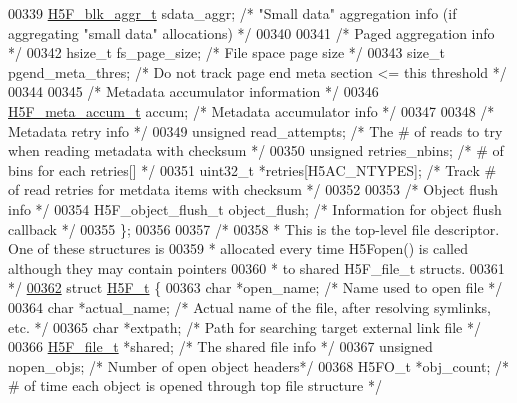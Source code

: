 \begin{DoxyCode}
00339     \hyperlink{struct_h5_f__blk__aggr__t}{H5F\_blk\_aggr\_t} sdata\_aggr;                  \textcolor{comment}{/* "Small data" aggregation info (if
       aggregating "small data" allocations) */}
00340 
00341     \textcolor{comment}{/* Paged aggregation info */}
00342     hsize\_t fs\_page\_size;                           \textcolor{comment}{/* File space page size */}
00343     \textcolor{keywordtype}{size\_t} pgend\_meta\_thres;                        \textcolor{comment}{/* Do not track page end meta section <= this threshold
       */}
00344 
00345     \textcolor{comment}{/* Metadata accumulator information */}
00346     \hyperlink{struct_h5_f__meta__accum__t}{H5F\_meta\_accum\_t} accum;     \textcolor{comment}{/* Metadata accumulator info            */}
00347 
00348     \textcolor{comment}{/* Metadata retry info */}
00349     \textcolor{keywordtype}{unsigned}        read\_attempts;  \textcolor{comment}{/* The # of reads to try when reading metadata with checksum */}
00350     \textcolor{keywordtype}{unsigned}        retries\_nbins;      \textcolor{comment}{/* # of bins for each retries[] */}
00351     uint32\_t        *retries[H5AC\_NTYPES];  \textcolor{comment}{/* Track # of read retries for metdata items with checksum */}
00352 
00353     \textcolor{comment}{/* Object flush info */}
00354     H5F\_object\_flush\_t  object\_flush;       \textcolor{comment}{/* Information for object flush callback */}
00355 \};
00356 
00357 \textcolor{comment}{/*}
00358 \textcolor{comment}{ * This is the top-level file descriptor.  One of these structures is}
00359 \textcolor{comment}{ * allocated every time H5Fopen() is called although they may contain pointers}
00360 \textcolor{comment}{ * to shared H5F\_file\_t structs.}
00361 \textcolor{comment}{ */}
\hyperlink{struct_h5_f__t}{00362} \textcolor{keyword}{struct }\hyperlink{struct_h5_f__t}{H5F\_t} \{
00363     \textcolor{keywordtype}{char}        *open\_name; \textcolor{comment}{/* Name used to open file   */}
00364     \textcolor{keywordtype}{char}        *actual\_name;   \textcolor{comment}{/* Actual name of the file, after resolving symlinks, etc. */}
00365     \textcolor{keywordtype}{char}                *extpath;       \textcolor{comment}{/* Path for searching target external link file */}
00366     \hyperlink{struct_h5_f__file__t}{H5F\_file\_t}        *shared;    \textcolor{comment}{/* The shared file info     */}
00367     \textcolor{keywordtype}{unsigned}        nopen\_objs; \textcolor{comment}{/* Number of open object headers*/}
00368     H5FO\_t              *obj\_count;     \textcolor{comment}{/* # of time each object is opened through top file structure */}

\end{DoxyCode}

